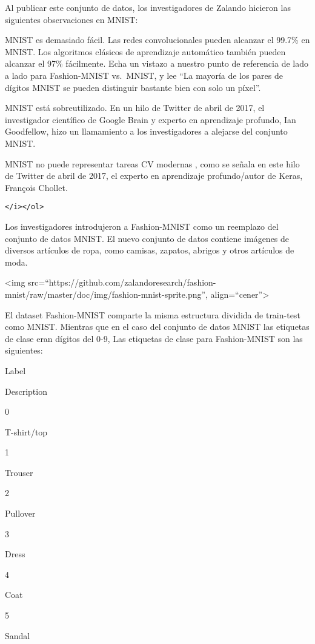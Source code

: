 \documentclass[11pt]{article}
\begin{document}
Al publicar este conjunto de datos, los investigadores de Zalando
hicieron las siguientes observaciones en MNIST:

MNIST es demasiado fácil. Las redes convolucionales pueden alcanzar el
99.7\% en MNIST. Los algoritmos clásicos de aprendizaje automático
también pueden alcanzar el 97\% fácilmente. Echa un vistazo a nuestro
punto de referencia de lado a lado para Fashion-MNIST vs.~MNIST, y lee
``La mayoría de los pares de dígitos MNIST se pueden distinguir bastante
bien con solo un píxel''.

MNIST está sobreutilizado. En un hilo de Twitter de abril de 2017, el
investigador científico de Google Brain y experto en aprendizaje
profundo, Ian Goodfellow, hizo un llamamiento a los investigadores a
alejarse del conjunto MNIST.

MNIST no puede representar tareas CV modernas , como se señala en este
hilo de Twitter de abril de 2017, el experto en aprendizaje
profundo/autor de Keras, François Chollet.

\begin{verbatim}
</i></ol>
\end{verbatim}

Los investigadores introdujeron a Fashion-MNIST como un reemplazo del
conjunto de datos MNIST. El nuevo conjunto de datos contiene imágenes de
diversos artículos de ropa, como camisas, zapatos, abrigos y otros
artículos de moda.

\textless{}img
src=``https://github.com/zalandoresearch/fashion-mnist/raw/master/doc/img/fashion-mnist-sprite.png'',
align=``cener''\textgreater{}

El dataset Fashion-MNIST comparte la misma estructura dividida de
train-test como MNIST. Mientras que en el caso del conjunto de datos
MNIST las etiquetas de clase eran dígitos del 0-9, Las etiquetas de
clase para Fashion-MNIST son las siguientes:

Label

Description

0

T-shirt/top

1

Trouser

2

Pullover

3

Dress

4

Coat

5

Sandal
\end{document}
